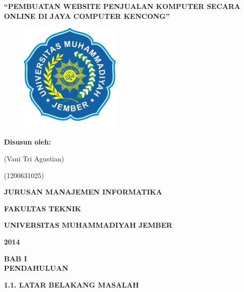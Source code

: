 \documentclass[11pt]{article}
\author{Boy}
\title{}
\begin{document}
\begin{center}


\textbf{{\Large ``PEMBUATAN WEBSITE PENJUALAN KOMPUTER SECARA ONLINE DI JAYA
COMPUTER KENCONG''}}
\end{center}

\begin{figure}[ht!]
  \centering
    \includegraphics[width=5cm]{gambar/LogoUnmuh}
\end{figure}

\begin{center}
\textbf{Disusun oleh:}
\end{center}

\begin{center}
(Vani Tri Agustian)
\end{center}

\begin{center}
(1200631025)
\end{center}

\begin{center}
\textbf{JURUSAN MANAJEMEN INFORMATIKA}
\end{center}

\begin{center}
\textbf{FAKULTAS TEKNIK}
\end{center}

\begin{center}
\textbf{UNIVERSITAS MUHAMMADIYAH JEMBER}
\end{center}

\begin{center}
\textbf{2014}
\end{center}

\newpage

\begin{center}
\textbf{BAB I
\\
PENDAHULUAN}
\end{center}

\textbf{1.1. LATAR BELAKANG MASALAH}
\end{document}
